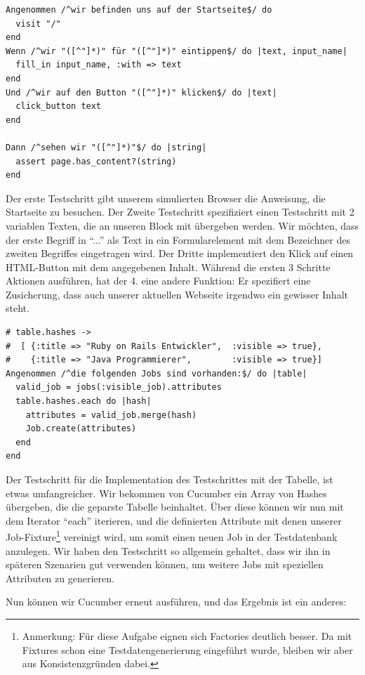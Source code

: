 \begin{lstlisting}
Angenommen /^wir befinden uns auf der Startseite$/ do 
  visit "/"
end
Wenn /^wir "([^"]*)" für "([^"]*)" eintippen$/ do |text, input_name|
  fill_in input_name, :with => text
end
Und /^wir auf den Button "([^"]*)" klicken$/ do |text|
  click_button text
end

Dann /^sehen wir "([^"]*)"$/ do |string|
  assert page.has_content?(string)
end
\end{lstlisting}
Der erste Testschritt gibt unserem simulierten Browser die Anweisung, die Startseite zu besuchen. Der Zweite Testschritt spezifiziert  einen Testschritt mit 2 variablen Texten, die an unseren Block mit übergeben werden. Wir möchten, dass der erste Begriff in "`..."' als Text in ein Formularelement mit dem Bezeichner des zweiten Begriffes eingetragen wird.
Der Dritte implementiert den Klick auf einen HTML-Button mit dem angegebenen Inhalt. 
Während die ersten 3 Schritte Aktionen ausführen, hat der 4. eine andere Funktion: Er spezifiert eine Zusicherung, dass auch unserer aktuellen Webseite irgendwo ein gewisser Inhalt steht.


\begin{lstlisting}
# table.hashes ->
#  [ {:title => "Ruby on Rails Entwickler",  :visible => true},
#    {:title => "Java Programmierer",        :visible => true}]
Angenommen /^die folgenden Jobs sind vorhanden:$/ do |table|
  valid_job = jobs(:visible_job).attributes
  table.hashes.each do |hash|
    attributes = valid_job.merge(hash)
    Job.create(attributes)
  end
end
\end{lstlisting}
Der Testschritt für die Implementation des Testschrittes mit der Tabelle, ist etwas umfangreicher. Wir bekommen von Cucumber ein Array von Hashes übergeben, die die geparste Tabelle beinhaltet. Über diese können wir nun mit dem Iterator "`each"' iterieren, und die definierten Attribute mit denen unserer Job-Fixture\footnote{Anmerkung: Für diese Aufgabe eignen sich Factories deutlich besser. Da mit Fixtures schon eine Testdatengenerierung eingeführt wurde, bleiben wir aber aus Konsistenzgründen dabei.} vereinigt wird, um somit einen neuen Job in der Testdatenbank anzulegen. Wir haben den Testschritt so allgemein gehaltet, dass wir ihn in späteren Szenarien gut verwenden können, um weitere Jobs mit speziellen Attributen zu generieren.

Nun können wir Cucumber erneut ausführen, und das Ergebnis ist ein anderes:


